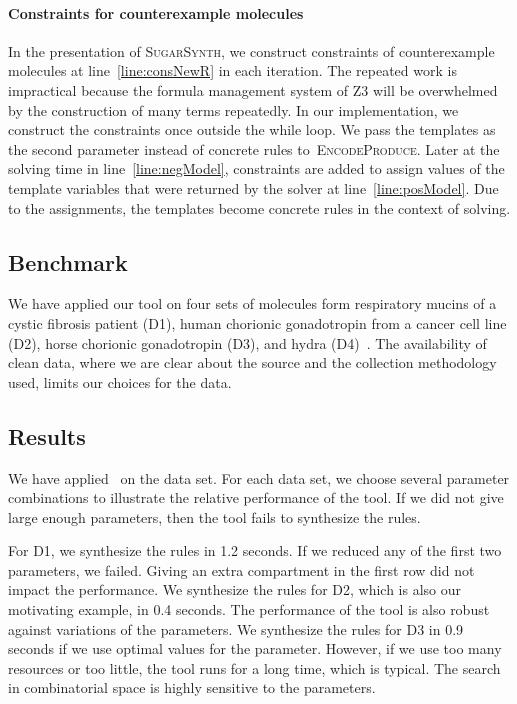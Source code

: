 \paragraph{Constraints for counterexample molecules}
In the presentation of \textsc{SugarSynth}, we construct constraints of counterexample molecules
at line~\ref{line:consNewR} in each iteration.
The repeated work is impractical because the formula management system of Z3 will be overwhelmed by
the construction of many terms repeatedly. In our implementation, we construct the constraints
once outside the while loop.
We pass the templates as the second parameter instead of concrete rules to~\textsc{EncodeProduce}.
Later at the solving time in line~\ref{line:negModel}, constraints are added to assign values
of the template variables that were returned by the solver at line~\ref{line:posModel}.
Due to the assignments, the templates become concrete rules in the context of solving.


\subsection{Benchmark}

We have applied our tool on four sets of molecules form
respiratory mucins of a cystic fibrosis patient (D1),
human chorionic gonadotropin from a cancer cell line (D2), horse chorionic gonadotropin (D3), and
hydra (D4)~\cite{Jaiman2018,hydra}.
The availability of clean data, where we are clear about the source and the collection
methodology used, limits our choices for the data.

\subsection{Results}


We have applied \ourtool~on the data set. For each data set, we choose several
parameter combinations to illustrate the relative performance of the tool.
If we did not give large enough parameters, then the tool fails to synthesize the rules.

For D1, we synthesize the rules in 1.2 seconds. If we reduced any of the first
two parameters, we failed.
Giving an extra compartment in the first row did not impact the performance.
We synthesize the rules for D2, which is also our motivating example, in 0.4 seconds.
The performance of the tool is also robust against variations of the parameters.
We synthesize the rules for D3 in 0.9 seconds if we use optimal values for the parameter.
However, if we use too many resources or too little, the tool runs for a long time,
which is typical. The search in combinatorial space is highly sensitive to the parameters.

